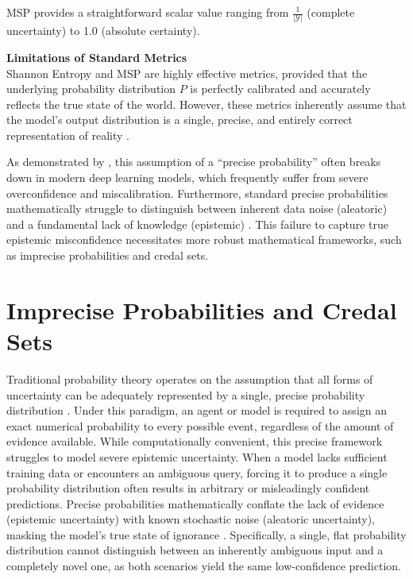 MSP provides a straightforward scalar value ranging from 
$\frac{1}{|\mathcal{Y}|}$ (complete uncertainty) to 1.0 
(absolute certainty).

\textbf{Limitations of Standard Metrics} \\
Shannon Entropy and MSP are highly effective metrics, provided 
that the underlying probability distribution $P$ is perfectly 
calibrated and accurately reflects the true state of the world. 
However, these metrics inherently assume that the model's output
distribution is a single, precise, and entirely correct representation
of reality 
\parencite{guo2017calibrationmodernneuralnetworks, Gneiting01032007}. 

As demonstrated by \textcite{guo2017calibrationmodernneuralnetworks},
this assumption of a ``precise probability'' often breaks down in modern
deep learning models, which frequently suffer from 
severe overconfidence and miscalibration. Furthermore, standard precise
probabilities mathematically struggle to distinguish between
inherent data noise (aleatoric) and a fundamental lack of 
knowledge (epistemic) \parencite{H_llermeier_2021}. 
This failure to capture true epistemic misconfidence
necessitates more robust mathematical frameworks, such as
imprecise probabilities and credal sets\parencite{Walley1991-WALSRW}.


\section{Imprecise Probabilities and Credal Sets}
\label{sec:background:credal_sets}
Traditional probability theory operates on the assumption that all
forms of uncertainty can be adequately represented by a single, 
precise probability distribution \parencite{Walley1991-WALSRW}.
Under this paradigm, an agent or model is required to assign an exact
numerical probability to every possible event, regardless of the 
amount of evidence available. While computationally convenient,
this precise framework struggles to model severe epistemic
uncertainty. When a model lacks sufficient training data or 
encounters an ambiguous query, forcing it to produce a single 
probability distribution often results in arbitrary or misleadingly
confident predictions. Precise probabilities mathematically conflate
the lack of evidence (epistemic uncertainty) with known stochastic
noise (aleatoric uncertainty), masking the model's true state of 
ignorance \parencite{H_llermeier_2021}. Specifically, a single, flat
probability distribution cannot distinguish between an inherently
ambiguous input and a completely novel one, as both scenarios yield
the same low-confidence prediction.


